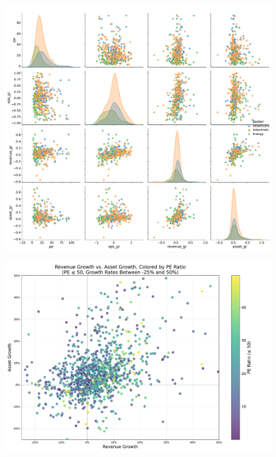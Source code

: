 \documentclass[10pt]{beamer}
\begin{document}
  \begin{frame}[plain] 
    \begin{center}
    \includegraphics[width=0.9\textwidth]{financial_images/pairplot_metrics_updated.pdf}
    \end{center}
\end{frame}

  \begin{frame}[plain] 
    \begin{center}
    \includegraphics[width=0.9\textwidth]{financial_images/scatter_revenue_asset_pe_restricted.pdf}
    \end{center}
  \end{frame}
\end{document}
